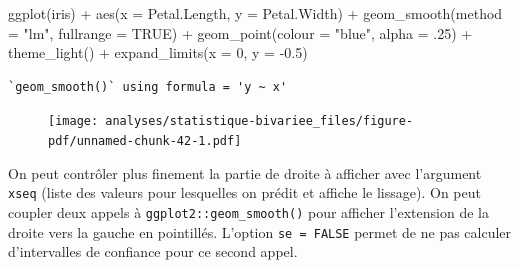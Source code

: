 \documentclass[
  letterpaper,
  DIV=11,
  numbers=noendperiod,
  oneside]{scrreprt}
\newenvironment{Shaded}{\begin{snugshade}}{\end{snugshade}}
\newcommand{\AttributeTok}[1]{\textcolor[rgb]{0.40,0.45,0.13}{#1}}
\newcommand{\ConstantTok}[1]{\textcolor[rgb]{0.56,0.35,0.01}{#1}}
\newcommand{\DecValTok}[1]{\textcolor[rgb]{0.68,0.00,0.00}{#1}}
\newcommand{\FloatTok}[1]{\textcolor[rgb]{0.68,0.00,0.00}{#1}}
\newcommand{\FunctionTok}[1]{\textcolor[rgb]{0.28,0.35,0.67}{#1}}
\newcommand{\NormalTok}[1]{\textcolor[rgb]{0.00,0.23,0.31}{#1}}
\newcommand{\SpecialCharTok}[1]{\textcolor[rgb]{0.37,0.37,0.37}{#1}}
\newcommand{\StringTok}[1]{\textcolor[rgb]{0.13,0.47,0.30}{#1}}
\begin{document}
\begin{tcolorbox}
\begin{Shaded}
\begin{Highlighting}[]
\FunctionTok{ggplot}\NormalTok{(iris) }\SpecialCharTok{+}
  \FunctionTok{aes}\NormalTok{(}\AttributeTok{x =}\NormalTok{ Petal.Length, }\AttributeTok{y =}\NormalTok{ Petal.Width) }\SpecialCharTok{+}
  \FunctionTok{geom\_smooth}\NormalTok{(}\AttributeTok{method =} \StringTok{"lm"}\NormalTok{, }\AttributeTok{fullrange =} \ConstantTok{TRUE}\NormalTok{) }\SpecialCharTok{+}
  \FunctionTok{geom\_point}\NormalTok{(}\AttributeTok{colour =} \StringTok{"blue"}\NormalTok{, }\AttributeTok{alpha =}\NormalTok{ .}\DecValTok{25}\NormalTok{) }\SpecialCharTok{+}
  \FunctionTok{theme\_light}\NormalTok{() }\SpecialCharTok{+}
  \FunctionTok{expand\_limits}\NormalTok{(}\AttributeTok{x =} \DecValTok{0}\NormalTok{, }\AttributeTok{y =} \SpecialCharTok{{-}}\FloatTok{0.5}\NormalTok{)}
\end{Highlighting}
\end{Shaded}

\begin{verbatim}
`geom_smooth()` using formula = 'y ~ x'
\end{verbatim}

\begin{figure}[H]

{\centering \texttt{[image: analyses/statistique-bivariee\_files/figure-pdf/unnamed-chunk-42-1.pdf]}

}

\end{figure}

On peut contrôler plus finement la partie de droite à afficher avec
l'argument \texttt{xseq} (liste des valeurs pour lesquelles on prédit et
affiche le lissage). On peut coupler deux appels à
\texttt{ggplot2::geom\_smooth()} pour afficher l'extension de la droite
vers la gauche en pointillés. L'option \texttt{se\ =\ FALSE} permet de
ne pas calculer d'intervalles de confiance pour ce second appel.


\end{tcolorbox}
\end{document}
